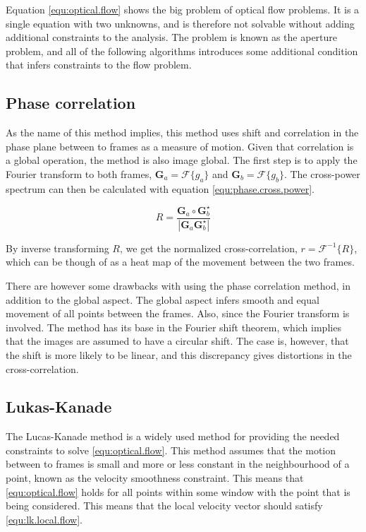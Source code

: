 Equation \eqref{equ:optical.flow} shows the big problem of optical flow problems. It is a single equation with two unknowns, and is therefore not 
solvable without adding additional constraints to the analysis. The problem is known as the aperture problem, and all of the following algorithms 
introduces some additional condition that infers constraints to the flow problem.

\subsection{Phase correlation}\label{sec:phase.correlation}
As the name of this method implies, this method uses shift and correlation in the phase plane between to frames as a measure of motion. Given that correlation is a global operation,
the method is also image global. The first step is to apply the Fourier transform to both frames, $\textbf{G}_a = \mathcal{F}\{g_a\}$ and $\textbf{G}_b = \mathcal{F}\{g_b\}$. The cross-power spectrum 
can then be calculated with equation \eqref{equ:phase.cross.power}.

\begin{equation}\label{equ:phase.cross.power}
	R = \frac{\textbf{G}_a \circ \textbf{G}_b^\star}{|\textbf{G}_a \textbf{G}_b^\star|}
\end{equation}

By inverse transforming $R$, we get the normalized cross-correlation, $r = \mathcal{F}^{-1}\{R\}$, which can be though of as a 
heat map of the movement between the two frames.

There are however some drawbacks with using the phase correlation method, in addition to the global aspect. The global aspect 
infers smooth and equal movement of all points between the frames. Also, since the Fourier transform is involved. The method has its base 
in the Fourier shift theorem, which implies that the images are assumed to have a circular shift. The case is, however, that the shift 
is more likely to be linear, and this discrepancy gives distortions in the cross-correlation.

\subsection{Lukas-Kanade}\label{sec:lukas-kanade}
The Lucas-Kanade method is a widely used method for providing the needed constraints to solve \eqref{equ:optical.flow}. This method assumes that 
the motion between to frames is small and more or less constant in the neighbourhood of a point, known as the velocity smoothness constraint. 
This means that \eqref{equ:optical.flow} holds for all points within some window
with the point that is being considered. This means that the local velocity vector should satisfy \eqref{equ:lk.local.flow}.

